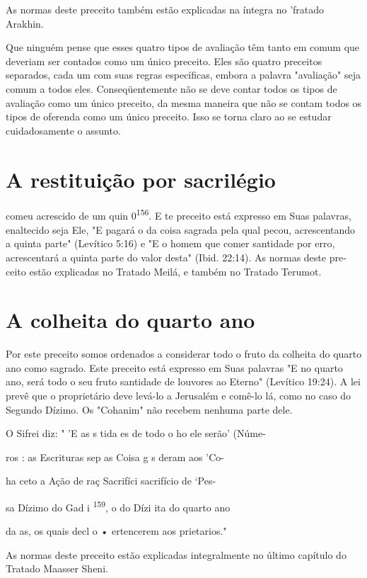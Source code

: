\begin{itemize}
\begin{enumrate}
\begin{itemize}
\begin{itemize}
As normas deste preceito também estão explicadas na íntegra no 'fra­tado
Arakhin.

Que ninguém pense que esses quatro tipos de avaliação têm tanto em comum
que deveriam ser contados como um único preceito. Eles são qua­tro
preceitos separados, cada um com suas regras específicas, embora a
palavra "avaliação" seja comum a todos eles. Conseqüentemente não se
deve contar todos os tipos de avaliação como um único preceito, da mesma
maneira que não se contam todos os tipos de oferenda como um único
preceito. Isso se tor­na claro ao se estudar cuidadosamente o assunto.

\section{A restituição por sacrilégio}



comeu acrescido de um quin 0\textsuperscript{156}. E te preceito está
expresso em Suas palavras, enaltecido seja Ele, "E pagará o da coisa
sagrada pela qual pecou, acrescen­tando a quinta parte" (Levítico 5:16)
e "E o homem que comer santidade por er­ro, acrescentará a quinta parte
do valor desta" (Ibid. 22:14). As normas deste pre­ceito estão
explicadas no Tratado Meilá, e também no Tratado Terumot.

\section{A colheita do quarto ano}

Por este preceito somos ordenados a considerar todo o fruto da co­lheita
do quarto ano como sagrado. Este preceito está expresso em Suas
pala­vras "E no quarto ano, será todo o seu fruto santidade de louvores
ao Eterno" (Levítico 19:24). A lei prevê que o proprietário deve levá-lo
a Jerusalém e comê-lo lá, como no caso do Segundo Dízimo. Os "Cohanim"
não recebem nenhuma parte dele.

O Sifrei diz: " 'E as s tida es de todo o ho ele serão' (Núme-

ros : as Escrituras sep as Coisa g s deram aos 'Co-

ha ceto a Ação de raç Sacrifíci sacrifício de `Pes-

sa Dízimo do Gad i \textsuperscript{159}, o do Dízi ita do quarto ano

da as, os quais decl o • ertencerem aos prietarios."

As normas deste preceito estão explicadas integralmente no último
capítulo do Tratado Maasser Sheni.


\end{itemize}
\end{itemize}
\end{enumrate}
\end{itemize}
